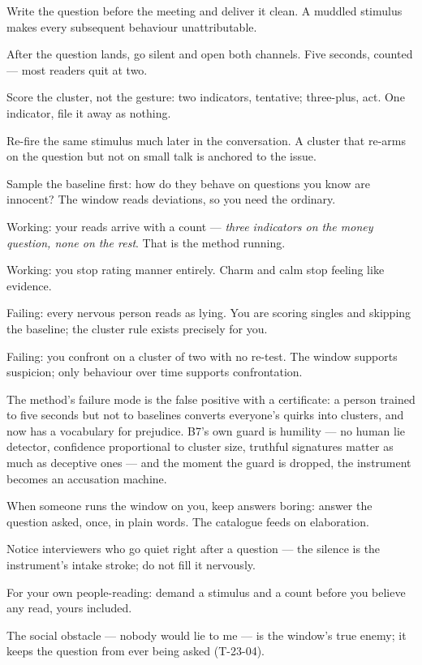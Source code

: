 \begin{application}
  \item Write the question before the meeting and deliver it clean. A muddled stimulus makes every subsequent behaviour unattributable.
  \item After the question lands, go silent and open both channels. Five seconds, counted --- most readers quit at two.
  \item Score the cluster, not the gesture: two indicators, tentative; three-plus, act. One indicator, file it away as nothing.
  \item Re-fire the same stimulus much later in the conversation. A cluster that re-arms on the question but not on small talk is anchored to the issue.
  \item Sample the baseline first: how do they behave on questions you know are innocent? The window reads deviations, so you need the ordinary.
\end{application}
\begin{feedback}
  \item Working: your reads arrive with a count --- \emph{three indicators on the money question, none on the rest}. That is the method running.
  \item Working: you stop rating manner entirely. Charm and calm stop feeling like evidence.
  \item Failing: every nervous person reads as lying. You are scoring singles and skipping the baseline; the cluster rule exists precisely for you.
  \item Failing: you confront on a cluster of two with no re-test. The window supports suspicion; only behaviour over time supports confrontation.
\end{feedback}
\begin{failure}
The method's failure mode is the false positive with a certificate: a person trained to five seconds but not to baselines converts everyone's quirks into clusters, and now has a vocabulary for prejudice. B7's own guard is humility --- no human lie detector, confidence proportional to cluster size, truthful signatures matter as much as deceptive ones --- and the moment the guard is dropped, the instrument becomes an accusation machine.
\end{failure}
\begin{countermeasures}
  \item When someone runs the window on you, keep answers boring: answer the question asked, once, in plain words. The catalogue feeds on elaboration.
  \item Notice interviewers who go quiet right after a question --- the silence is the instrument's intake stroke; do not fill it nervously.
  \item For your own people-reading: demand a stimulus and a count before you believe any read, yours included.
  \item The social obstacle --- nobody would lie to me --- is the window's true enemy; it keeps the question from ever being asked (T-23-04).
\end{countermeasures}

\seesources
{}
